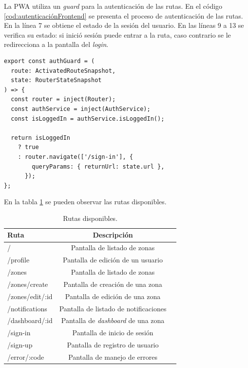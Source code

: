 La PWA utiliza un \emph{guard} para la autenticación de las rutas.  En el código \ref{cod:autenticaciónFrontend} se presenta el proceso de autenticación de las rutas. En la línea 7 se obtiene el estado de la sesión del usuario. En las líneas 9 a 13 se verifica su estado: si inició sesión puede entrar a la ruta, caso contrario se le redirecciona a la pantalla del \emph{login}.

\newpage
\begin{lstlisting}[label=cod:autenticaciónFrontend,caption=Autenticación de rutas.]
export const authGuard = (
  route: ActivatedRouteSnapshot,
  state: RouterStateSnapshot
) => {
  const router = inject(Router);
  const authService = inject(AuthService);
  const isLoggedIn = authService.isLoggedIn();

  return isLoggedIn
    ? true
    : router.navigate(['/sign-in'], {
        queryParams: { returnUrl: state.url },
      });
};
\end{lstlisting} 

En la tabla \ref{tab:tablaRutasFrontend} se pueden observar las rutas disponibles.

\begin{table}[H]
	\centering
	\caption[Rutas disponibles]{Rutas disponibles.}
	\begin{tabular}{l c c}    
		\toprule
		\textbf{Ruta}& \textbf{Descripción}\\
		\midrule
		/ & Pantalla de listado de zonas \\
		/profile & Pantalla de edición de un usuario \\
		/zones & Pantalla de listado de zonas \\
		/zones/create & Pantalla de creación de una zona \\
		/zones/edit/:id & Pantalla de edición de una zona \\
		/notifications & Pantalla de listado de notificaciones \\
		/dashboard/:id & Pantalla de \emph{dashboard} de una zona \\
		/sign-in & Pantalla de inicio de sesión \\
		/sign-up & Pantalla de registro de usuario \\
		/error/:code & Pantalla de manejo de errores \\
		\bottomrule
		\hline
	\end{tabular}
	\label{tab:tablaRutasFrontend}
\end{table}

